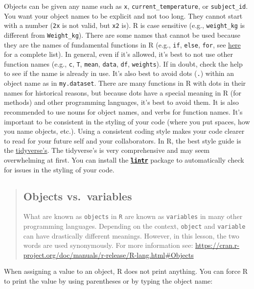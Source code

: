 \documentclass[]{book}
\begin{document}
Objects can be given any name such as \texttt{x},
\texttt{current\_temperature}, or \texttt{subject\_id}. You want your
object names to be explicit and not too long. They cannot start with a
number (\texttt{2x} is not valid, but \texttt{x2} is). R is case
sensitive (e.g., \texttt{weight\_kg} is different from
\texttt{Weight\_kg}). There are some names that cannot be used because
they are the names of fundamental functions in R (e.g., \texttt{if},
\texttt{else}, \texttt{for}, see
\href{https://stat.ethz.ch/R-manual/R-devel/library/base/html/Reserved.html}{here}
for a complete list). In general, even if it's allowed, it's best to not
use other function names (e.g., \texttt{c}, \texttt{T}, \texttt{mean},
\texttt{data}, \texttt{df}, \texttt{weights}). If in doubt, check the
help to see if the name is already in use. It's also best to avoid dots
(\texttt{.}) within an object name as in \texttt{my.dataset}. There are
many functions in R with dots in their names for historical reasons, but
because dots have a special meaning in R (for methods) and other
programming languages, it's best to avoid them. It is also recommended
to use nouns for object names, and verbs for function names. It's
important to be consistent in the styling of your code (where you put
spaces, how you name objects, etc.). Using a consistent coding style
makes your code clearer to read for your future self and your
collaborators. In R, the best style guide is the
\href{http://style.tidyverse.org/}{tidyverse's}. The tidyverse's is very
comprehensive and may seem overwhelming at first. You can install the
\href{https://github.com/jimhester/lintr}{\textbf{\texttt{lintr}}}
package to automatically check for issues in the styling of your code.

\begin{quote}
\subsection{Objects vs.~variables}\label{objects-vs.variables}

What are known as \texttt{objects} in \texttt{R} are known as
\texttt{variables} in many other programming languages. Depending on the
context, \texttt{object} and \texttt{variable} can have drastically
different meanings. However, in this lesson, the two words are used
synonymously. For more information see:
\url{https://cran.r-project.org/doc/manuals/r-release/R-lang.html\#Objects}
\end{quote}

When assigning a value to an object, R does not print anything. You can
force R to print the value by using parentheses or by typing the object
name:
\end{document}
